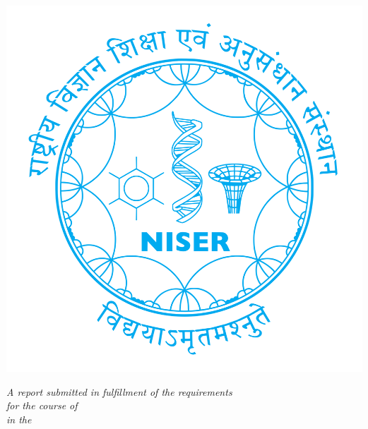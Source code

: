 \documentclass[
11pt, %
oneside, %
english, %
singlespacing, %
headsepline, %
]{thesis} %
\begin{document}
\begin{titlepage}
\begin{center}
\includegraphics[scale=0.1]{niser-logo.png} %

\large \textit{A report submitted in fulfillment of the requirements\\ for the course of \degreename}\\[0.3cm] %
\textit{in the}\\[0.4cm]
\groupname\\\deptname\\[2cm] %


\end{center}
\end{titlepage}

\end{document}
